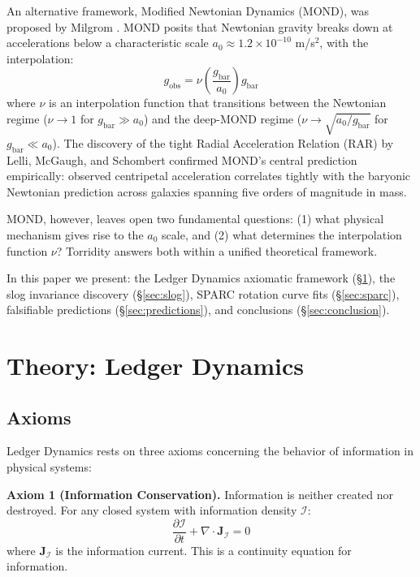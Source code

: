 \documentclass[aps,prl,twocolumn,superscriptaddress,nofootinbib]{revtex4-2}
\begin{document}
An alternative framework, Modified Newtonian Dynamics (MOND), was proposed by Milgrom \cite{Milgrom1983}. MOND posits that Newtonian gravity breaks down at accelerations below a characteristic scale $a_0 \approx 1.2 \times 10^{-10}$ m/s$^2$, with the interpolation:
\begin{equation}
    g_\mathrm{obs} = \nu\!\left(\frac{g_\mathrm{bar}}{a_0}\right) g_\mathrm{bar}
\end{equation}
where $\nu$ is an interpolation function that transitions between the Newtonian regime ($\nu \to 1$ for $g_\mathrm{bar} \gg a_0$) and the deep-MOND regime ($\nu \to \sqrt{a_0/g_\mathrm{bar}}$ for $g_\mathrm{bar} \ll a_0$). The discovery of the tight Radial Acceleration Relation (RAR) by Lelli, McGaugh, and Schombert \cite{Lelli2016,McGaugh2016} confirmed MOND's central prediction empirically: observed centripetal acceleration correlates tightly with the baryonic Newtonian prediction across galaxies spanning five orders of magnitude in mass.

MOND, however, leaves open two fundamental questions: (1) what physical mechanism gives rise to the $a_0$ scale, and (2) what determines the interpolation function $\nu$? Torridity answers both within a unified theoretical framework.

In this paper we present: the Ledger Dynamics axiomatic framework (\S\ref{sec:theory}), the slog invariance discovery (\S\ref{sec:slog}), SPARC rotation curve fits (\S\ref{sec:sparc}), falsifiable predictions (\S\ref{sec:predictions}), and conclusions (\S\ref{sec:conclusion}).

\section{Theory: Ledger Dynamics}
\label{sec:theory}

\subsection{Axioms}

Ledger Dynamics rests on three axioms concerning the behavior of information in physical systems:

\textbf{Axiom 1 (Information Conservation).} Information is neither created nor destroyed. For any closed system with information density $\mathcal{I}$:
\begin{equation}
    \frac{\partial \mathcal{I}}{\partial t} + \nabla \cdot \mathbf{J}_\mathcal{I} = 0
\end{equation}
where $\mathbf{J}_\mathcal{I}$ is the information current. This is a continuity equation for information.
\end{document}
